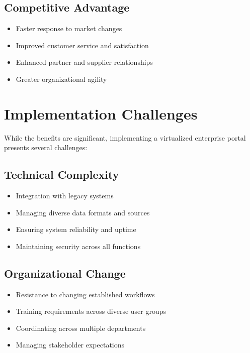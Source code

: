\subsection{Competitive Advantage}

\begin{itemize}
	\item Faster response to market changes
	\item Improved customer service and satisfaction
	\item Enhanced partner and supplier relationships
	\item Greater organizational agility
\end{itemize}

\section{Implementation Challenges}
\label{sec:implementation-challenges}

While the benefits are significant, implementing a virtualized enterprise portal presents several challenges:

\subsection{Technical Complexity}

\begin{itemize}
	\item Integration with legacy systems
	\item Managing diverse data formats and sources
	\item Ensuring system reliability and uptime
	\item Maintaining security across all functions
\end{itemize}

\subsection{Organizational Change}

\begin{itemize}
	\item Resistance to changing established workflows
	\item Training requirements across diverse user groups
	\item Coordinating across multiple departments
	\item Managing stakeholder expectations
\end{itemize}


